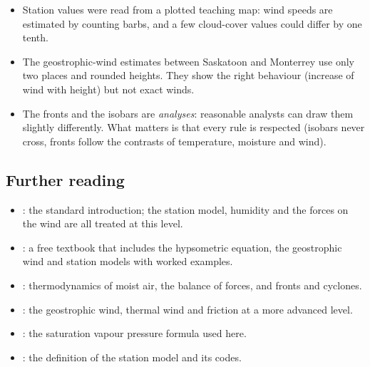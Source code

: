 \begin{itemize}
\item Station values were read from a plotted teaching map: wind speeds are estimated by counting barbs, and a few cloud-cover values could differ by one tenth.
\item The geostrophic-wind estimates between Saskatoon and Monterrey use only two places and rounded heights. They show the right behaviour (increase of wind with height) but not exact winds.
\item The fronts and the isobars are \emph{analyses}: reasonable analysts can draw them slightly differently. What matters is that every rule is respected (isobars never cross, fronts follow the contrasts of temperature, moisture and wind).
\end{itemize}

\subsection{Further reading}

\begin{itemize}
\item \citet{ahrens2022}: the standard introduction; the station model, humidity and the forces on the wind are all treated at this level.
\item \citet{stull2017}: a free textbook that includes the hypsometric equation, the geostrophic wind and station models with worked examples.
\item \citet{wallace2006}: thermodynamics of moist air, the balance of forces, and fronts and cyclones.
\item \citet{holton2013}: the geostrophic wind, thermal wind and friction at a more advanced level.
\item \citet{bolton1980}: the saturation vapour pressure formula used here.
\item \citet{wmo2019}: the definition of the station model and its codes.
\end{itemize}
